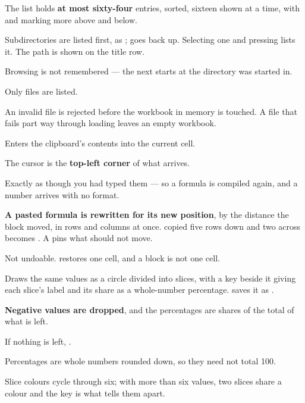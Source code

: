 \begin{ccsteps}
\item The list holds \textbf{at most sixty-four} entries, sorted, sixteen shown
at a time, with \lit{\^{}} and  marking more above and below.
\item Subdirectories are listed first, as ;  goes back up.
Selecting one and pressing  lists it. The path is shown on the
title row.
\item Browsing is not remembered --- the next  starts at the
directory \ccprod{} was started in.
\item Only  files are listed.
\item An invalid file is rejected before the workbook in memory is touched. A
file that fails part way through loading leaves an empty workbook.
\end{ccsteps}


Enters the clipboard's contents into the current cell.

\begin{ccsteps}
\item The cursor is the \textbf{top-left corner} of what arrives.
\item Exactly as though you had typed them --- so a formula is compiled again,
and a number arrives with no format.
\item \textbf{A pasted formula is rewritten for its new position}, by the
distance the block moved, in rows and columns at once.  copied five
rows down and two across becomes . A \lit{\$} pins what should not
move.
\item Not undoable.  restores one cell, and a block is not one cell.
\end{ccsteps}


Draws the same values as a circle divided into slices, with a key beside it
giving each slice's label and its share as a whole-number percentage. 
saves it as .

\begin{ccsteps}
\item \textbf{Negative values are dropped}, and the percentages are shares of
the total of what is left.
\item If nothing is left, .
\item Percentages are whole numbers rounded down, so they need not total 100.
\item Slice colours cycle through six; with more than six values, two slices
share a colour and the key is what tells them apart.
\end{ccsteps}

